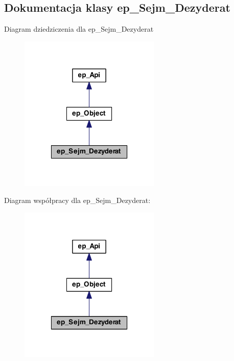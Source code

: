 \hypertarget{classep___sejm___dezyderat}{\subsection{Dokumentacja klasy ep\-\_\-\-Sejm\-\_\-\-Dezyderat}
\label{classep___sejm___dezyderat}
}


Diagram dziedziczenia dla ep\-\_\-\-Sejm\-\_\-\-Dezyderat\nopagebreak
\begin{figure}[H]
\begin{center}
\leavevmode
\includegraphics[width=190pt]{classep___sejm___dezyderat__inherit__graph}
\end{center}
\end{figure}


Diagram współpracy dla ep\-\_\-\-Sejm\-\_\-\-Dezyderat\-:\nopagebreak
\begin{figure}[H]
\begin{center}
\leavevmode
\includegraphics[width=190pt]{classep___sejm___dezyderat__coll__graph}
\end{center}
\end{figure}
